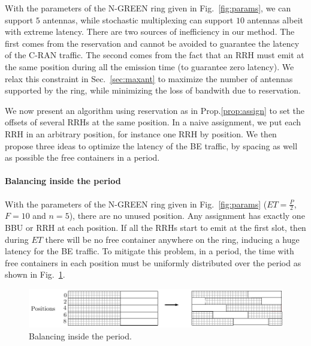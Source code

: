 \documentclass[10pt, conference, letterpaper]{IEEEtran}
\begin{document}
With the parameters of the N-GREEN ring given in Fig.~\ref{fig:params}, we can support $5$ antennas, while stochastic multiplexing can support $10$ antennas albeit with extreme latency. There are two sources of inefficiency in our method. The first comes from the reservation and cannot be avoided to guarantee the latency of the C-RAN traffic. The second comes from the fact that an RRH must emit at the same position during all the emission time (to guarantee zero latency). We relax this constraint in Sec.~\ref{sec:maxant} to maximize the number of antennas supported by the ring, while minimizing the loss of bandwith due to reservation.

We now present an algorithm using reservation as in Prop.\ref{prop:assign} to set the offsets of several RRHs at the same position. In a naive assignment, we put each RRH in an arbitrary position, for instance one RRH by position. We then propose three ideas to optimize the latency of the BE traffic, by spacing as well as possible the free containers in a period.

\paragraph{Balancing inside the period}

With the parameters of the N-GREEN ring given in Fig.~\ref{fig:params} ($ET = \frac{P}{2}$, $F = 10$ and $n = 5$), there are no unused position. Any assignment has exactly one  BBU or RRH at each position. If all the RRHs start to emit at the first slot, then during $ET$ there will be no free container anywhere on the ring, inducing a huge latency for the BE traffic. 
To mitigate this problem, in a period, the time with free containers in each position must be uniformly distributed over the period as shown in Fig.~\ref{fig:periodbal}.
\begin{figure}[h!]
\begin{center}   

      \includegraphics[scale=0.55]{repart2}
     \caption{Balancing inside the period.}\label{fig:periodbal}
     
\end{center}
  \end{figure}  
     \vspace{-0.4cm}
  
\end{document}
